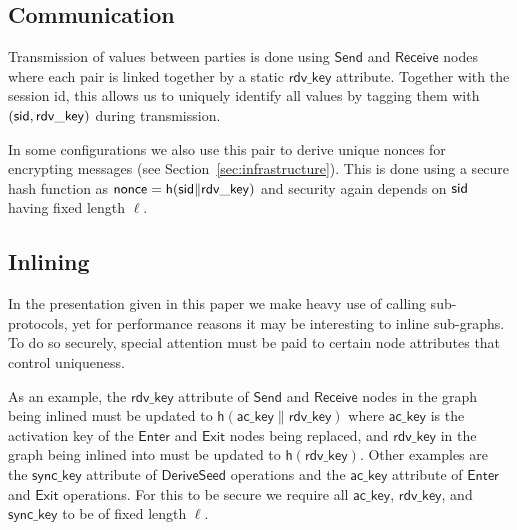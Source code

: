 \subsection{Communication}

Transmission of values between parties is done using $\mathsf{Send}$ and $\mathsf{Receive}$ nodes where each pair is linked together by a static $\mathsf{rdv\_key}$ attribute. Together with the session id, this allows us to uniquely identify all values by tagging them with $(\mathsf{sid}, \mathsf{rdv\_key})$ during transmission.

In some configurations we also use this pair to derive unique nonces for encrypting messages (see Section~\ref{sec:infrastructure}). This is done using a secure hash function as $\mathsf{nonce} = \mathsf{h}(\mathsf{sid} \| \mathsf{rdv\_key})$ and security again depends on $\mathsf{sid}$ having fixed length $\ell$.


\subsection{Inlining}

In the presentation given in this paper we make heavy use of calling sub-protocols, yet for performance reasons it may be interesting to inline sub-graphs. To do so securely, special attention must be paid to certain node attributes that control uniqueness.

As an example, the $\mathsf{rdv\_key}$ attribute of $\mathsf{Send}$ and $\mathsf{Receive}$ nodes in the graph being inlined must be updated to $\mathsf{h}(\mathsf{ac\_key} \| \mathsf{rdv\_key})$ where $\mathsf{ac\_key}$ is the activation key of the $\mathsf{Enter}$ and $\mathsf{Exit}$ nodes being replaced, and $\mathsf{rdv\_key}$ in the graph being inlined into must be updated to $\mathsf{h}(\mathsf{rdv\_key})$. Other examples are the $\mathsf{sync\_key}$ attribute of $\mathsf{DeriveSeed}$ operations and the $\mathsf{ac\_key}$ attribute of $\mathsf{Enter}$ and $\mathsf{Exit}$ operations. For this to be secure we require all $\mathsf{ac\_key}$, $\mathsf{rdv\_key}$, and $\mathsf{sync\_key}$ to be of fixed length $\ell$.
